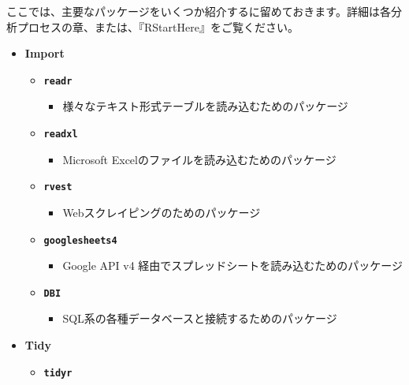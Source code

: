 \documentclass[
  12pt,
]{book}
\providecommand{\tightlist}{%
  \setlength{\itemsep}{0pt}\setlength{\parskip}{0pt}}
\begin{document}
ここでは、主要なパッケージをいくつか紹介するに留めておきます。詳細は各分析プロセスの章、または、『RStartHere』\citep{RStartHere:GitHub}をご覧ください。

\begin{itemize}
\tightlist
\item
  \textbf{Import}

  \begin{itemize}
  \tightlist
  \item
    \textbf{\texttt{readr}} \citep{R-readr}

    \begin{itemize}
    \tightlist
    \item
      様々なテキスト形式テーブルを読み込むためのパッケージ
    \end{itemize}
  \item
    \textbf{\texttt{readxl}} \citep{R-readxl}

    \begin{itemize}
    \tightlist
    \item
      Microsoft Excelのファイルを読み込むためのパッケージ
    \end{itemize}
  \item
    \textbf{\texttt{rvest}} \citep{R-rvest}

    \begin{itemize}
    \tightlist
    \item
      Webスクレイピングのためのパッケージ
    \end{itemize}
  \item
    \textbf{\texttt{googlesheets4}} \citep{R-googlesheets4}

    \begin{itemize}
    \tightlist
    \item
      Google API v4 経由でスプレッドシートを読み込むためのパッケージ
    \end{itemize}
  \item
    \textbf{\texttt{DBI}} \citep{R-DBI}

    \begin{itemize}
    \tightlist
    \item
      SQL系の各種データベースと接続するためのパッケージ
    \end{itemize}
  \end{itemize}
\item
  \textbf{Tidy}

  \begin{itemize}
  \tightlist
  \item
    \textbf{\texttt{tidyr}} \citep{R-tidyr}


\end{itemize}
\end{itemize}
\end{document}
